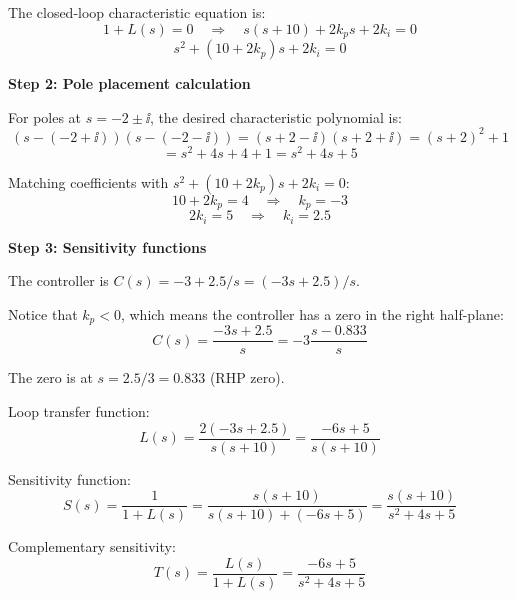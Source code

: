 \documentclass[11pt,a4paper]{article}
\begin{document}
The closed-loop characteristic equation is:
\begin{equation}
  1 + L(s) = 0 \quad \Rightarrow \quad s(s+10) + 2k_ps + 2k_i = 0
\end{equation}
\begin{equation}
  s^2 + (10 + 2k_p)s + 2k_i = 0
\end{equation}

\textbf{Step 2: Pole placement calculation}

For poles at $s = -2 \pm \ii$, the desired characteristic polynomial is:
\begin{equation}
  (s - (-2 + \ii))(s - (-2 - \ii)) = (s+2-\ii)(s+2+\ii) = (s+2)^2 + 1
\end{equation}
\begin{equation}
  = s^2 + 4s + 4 + 1 = s^2 + 4s + 5
\end{equation}

Matching coefficients with $s^2 + (10 + 2k_p)s + 2k_i = 0$:
\begin{equation}
  10 + 2k_p = 4 \quad \Rightarrow \quad k_p = -3
\end{equation}
\begin{equation}
  2k_i = 5 \quad \Rightarrow \quad k_i = 2.5
\end{equation}

\textbf{Step 3: Sensitivity functions}

The controller is $C(s) = -3 + 2.5/s = (-3s + 2.5)/s$.

Notice that $k_p < 0$, which means the controller has a zero in the right half-plane:
\begin{equation}
  C(s) = \frac{-3s + 2.5}{s} = -3\frac{s - 0.833}{s}
\end{equation}

The zero is at $s = 2.5/3 = 0.833$ (RHP zero).

Loop transfer function:
\begin{equation}
  L(s) = \frac{2(-3s + 2.5)}{s(s+10)} = \frac{-6s + 5}{s(s+10)}
\end{equation}

Sensitivity function:
\begin{equation}
  S(s) = \frac{1}{1 + L(s)} = \frac{s(s+10)}{s(s+10) + (-6s + 5)} = \frac{s(s+10)}{s^2 + 4s + 5}
\end{equation}

Complementary sensitivity:
\begin{equation}
  T(s) = \frac{L(s)}{1 + L(s)} = \frac{-6s + 5}{s^2 + 4s + 5}
\end{equation}
\end{document}
